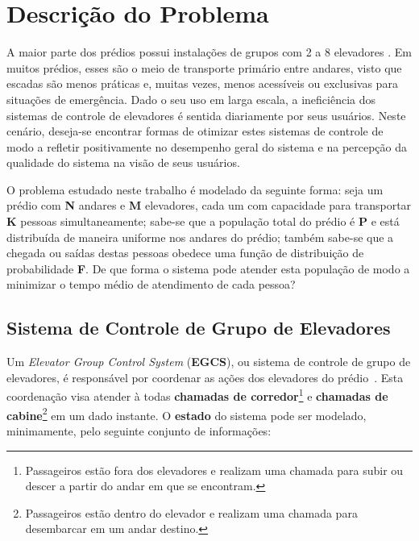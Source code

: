 \chapter{\label{chap:problem}Descrição do Problema}

A maior parte dos prédios possui instalações de grupos com 2 a 8 elevadores
\cite{KOEHLEROTTIGER02}. Em muitos prédios, esses são o meio de transporte
primário entre andares, visto que escadas são menos práticas e, muitas vezes,
menos acessíveis ou exclusivas para situações de emergência. Dado o seu uso em
larga escala, a ineficiência dos sistemas de controle de elevadores é sentida
diariamente por seus usuários. Neste cenário, deseja-se encontrar formas de
otimizar estes sistemas de controle de modo a refletir positivamente no
desempenho geral do sistema e na percepção da qualidade do sistema na visão de
seus usuários.

O problema estudado neste trabalho é modelado da seguinte forma: seja um prédio
com \textbf{N} andares e \textbf{M} elevadores, cada um com capacidade para
transportar \textbf{K} pessoas simultaneamente; sabe-se que a população total do
prédio é \textbf{P} e está distribuída de maneira uniforme nos andares do
prédio; também sabe-se que a chegada ou saídas destas pessoas obedece uma função
de distribuição de probabilidade \textbf{F}. De que forma o sistema pode atender
esta população de modo a minimizar o tempo médio de atendimento de cada pessoa?

\section{Sistema de Controle de Grupo de Elevadores}

Um \textit{Elevator Group Control System} (\textbf{EGCS}), ou sistema de
controle de grupo de elevadores, é responsável por coordenar as ações dos
elevadores do prédio~\cite{kuzunuki1984elevator}. Esta coordenação visa atender
à todas \textbf{chamadas de corredor}\footnote{Passageiros estão fora dos
elevadores e realizam uma chamada para subir ou descer a partir do andar em que
se encontram.} e \textbf{chamadas de cabine}\footnote{Passageiros estão dentro
do elevador e realizam uma chamada para desembarcar em um andar destino.} em um
dado instante. O \textbf{estado} do sistema pode ser modelado, minimamente, pelo
seguinte conjunto de informações:

